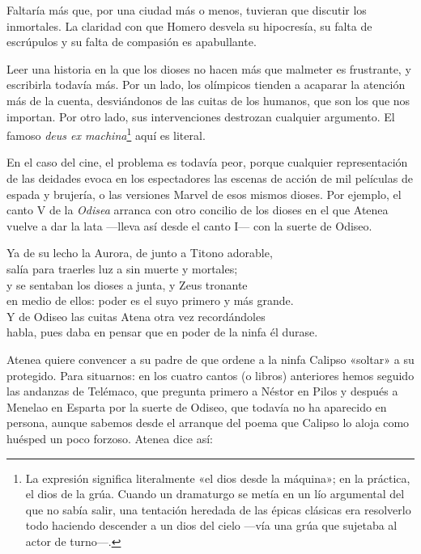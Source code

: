 Faltaría más que, por una ciudad más o menos, tuvieran que discutir los inmortales. La claridad con que Homero desvela su hipocresía, su falta de escrúpulos y su falta de compasión es apabullante.

Leer una historia en la que los dioses no hacen más que malmeter es frustrante, y escribirla todavía más. Por un lado, los olímpicos tienden a acaparar la atención más de la cuenta, desviándonos de las cuitas de los humanos, que son los que nos importan. Por otro lado, sus intervenciones destrozan cualquier argumento. El famoso \emph{deus ex machina}\footnote{La expresión significa literalmente «el dios desde la máquina»; en la práctica, el dios de la grúa. Cuando un dramaturgo se metía en un lío argumental del que no sabía salir, una tentación heredada de las épicas clásicas era resolverlo todo haciendo descender a un dios del cielo ---vía una grúa que sujetaba al actor de turno---.} aquí es literal.

En el caso del cine, el problema es todavía peor, porque cualquier representación de las deidades evoca en los espectadores las escenas de acción de mil películas de espada y brujería, o las versiones Marvel de esos mismos dioses.
Por ejemplo, el canto V de la \emph{Odisea} arranca con otro concilio de los dioses en el que Atenea vuelve a dar la lata ---lleva así desde el canto I--- con la suerte de Odiseo.

\begin{versocita}
Ya de su lecho la Aurora, de junto a Titono adorable,\\
salía para traerles luz a sin muerte y mortales;\\
y se sentaban los dioses a junta, y Zeus tronante\\
en medio de ellos: poder es el suyo primero y más grande.\\
Y de Odiseo las cuitas Atena otra vez recordándoles\\
habla, pues daba en pensar que en poder de la ninfa él durase.
\end{versocita}

Atenea quiere convencer a su padre de que ordene a la ninfa Calipso «soltar» a su protegido. Para situarnos: en los cuatro cantos (o libros) anteriores hemos seguido las andanzas de Telémaco, que pregunta primero a Néstor en Pilos y después a Menelao en Esparta por la suerte de Odiseo, que todavía no ha aparecido en persona, aunque sabemos desde el arranque del poema que Calipso lo aloja como huésped un poco forzoso. Atenea dice así:

